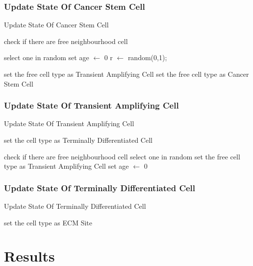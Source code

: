 \documentclass[a4paper,10pt]{article}
\begin{document}
\subsubsection{Update State Of Cancer Stem Cell}
\begin{algorithm}[H] %
 \caption{Update State Of Cancer Stem Cell}
     \SetAlgoLined
     
      {
       check if there are free neighbourhood cell\;       
       
        {
	  select one in random\;
	  set age $\gets$  0\;        
	  r $\gets$  random(0,1);
	  
	    {
	    set the free cell type as Transient Amplifying Cell\;        
	    }
	    {
	    set the free cell type as Cancer Stem Cell\;
	    }       
        }                     
      }
\end{algorithm}

\subsubsection{Update State Of Transient Amplifying Cell}
\begin{algorithm}[H] %
 \caption{Update State Of Transient Amplifying Cell}
     \SetAlgoLined
           
     {
        {
          set the cell type as Terminally Differentiated Cell\;
        }
        {        
	    check if there are free neighbourhood cell\;
	     {
	      select one in random\;
	      set the free cell type as Transient Amplifying Cell\;
	      set age $\gets$  0\;
	     } 
	    
        }                     
      }
\end{algorithm}
 
 
\subsubsection{Update State Of Terminally Differentiated Cell }

\begin{algorithm}[H] %
 \caption{Update State Of Terminally Differentiated Cell}
     \SetAlgoLined
           
     {
        {
          set the cell type as ECM Site\;
        }
      }
\end{algorithm}

\section{Results}
\end{document}
